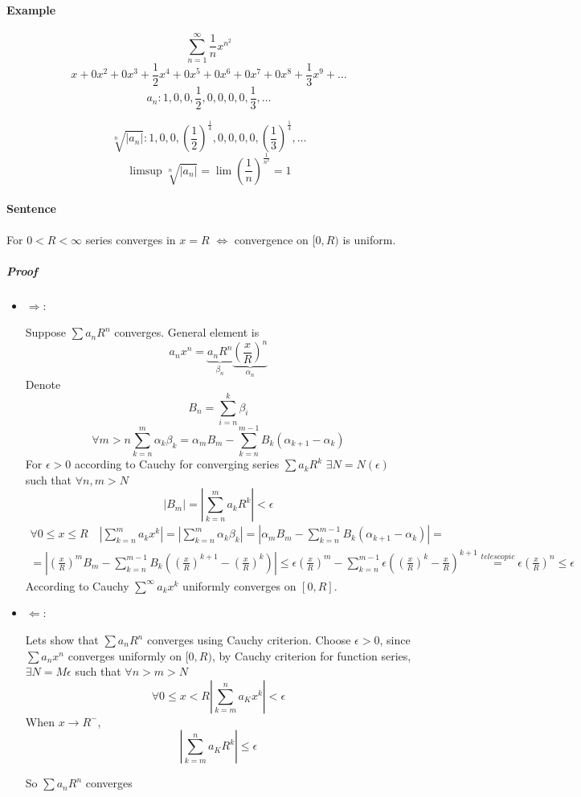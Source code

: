 \paragraph{Example}
$$\sum_{n=1}^{\infty} \frac{1}{n}x^{n^2}$$
$$x+0x^2+0x^3+\frac{1}{2}x^4+0x^5+0x^6+0x^7+0x^8+\frac{1}{3}x^9+\dots$$
$$a_n: 1,0,0,\frac{1}{2},0,0,0,0,\frac{1}{3},\dots$$

$$\sqrt[n]{|a_n|}: 1,0,0,\left(\frac{1}{2}\right)^{\frac{1}{4}},0,0,0,0,\left(\frac{1}{3}\right)^{\frac{1}{4}},\dots$$
$$\limsup \sqrt[n]{|a_n|} = \lim \left(\frac{1}{n}\right)^{\frac{1}{n^2}} =1 $$
\paragraph{Sentence}
For $0<R<\infty$ series converges in $x=R$ $\iff$ convergence on $[0, R)$ is uniform.
\subparagraph{Proof}
\begin{itemize}
	\item $\Rightarrow$:
	
	Suppose $\sum a_n R^n$ converges.  General element is
	$$a_n x^n = \underbrace{a_nR^n}_{\beta_n}\underbrace{ \left(\frac{x}{R}\right)^n}_{\alpha_n}$$
	Denote 
	$$B_n = \sum_{i=n}^k \beta_i$$
	$$\forall m>n \sum_{k=n}^{m} \alpha_k \beta_k = \alpha_m B_m - \sum_{k=n}^{m-1} B_k \left( \alpha_{k+1} - \alpha_k \right)$$
	For $\epsilon > 0$ according to Cauchy for converging series $\sum a_k R^k$ $\exists N = N(\epsilon)$ such that $\forall n,m > N$ 
	$$\left|B_m\right| = \left|\sum_{k=n}^m a_kR^k\right| < \epsilon$$
	\begin{align*}
	\forall 0 \leq x \leq R \quad  \left|\sum_{k=n}^m a_kx^k\right|  =  \left|\sum_{k=n}^m \alpha_k \beta_k \right| = \left|\alpha_m B_m - \sum_{k=n}^{m-1} B_k \left( \alpha_{k+1} - \alpha_k \right)\right| =\\= \left|\left(\frac{x}{R}\right)^mB_m - \sum_{k=n}^{m-1} B_k \left( \left(\frac{x}{R}\right)^{k+1} - \left(\frac{x}{R}\right)^k \right)\right| \leq \epsilon \left(\frac{x}{R}\right)^m- \sum_{k=n}^{m-1} \epsilon  \left(\left(\frac{x}{R}\right)^k - \frac{x}{R}\right)^{k+1}  \stackrel{telescopic}{=} \epsilon \left(\frac{x}{R}\right)^n \leq \epsilon
	\end{align*}
	According to Cauchy $\sum^\infty a_k x^k$ uniformly converges on $[0,R]$.
	\item $\Leftarrow$:
	
	Lets show that $\sum a_nR^n$ converges using Cauchy criterion.
	Choose $\epsilon > 0$, since $\sum a_nx^n$ converges uniformly on $[0,R)$, by Cauchy criterion for function series, $\exists N =M\epsilon$ such that $\forall n>m>N$ 
	$$\forall 0\leq x< R \left|\sum_{k=m}^n a_Kx^k\right| < \epsilon$$
	When $x \to R^-$,
	$$\left|\sum_{k=m}^n a_KR^k\right| \leq \epsilon$$
	
	So $\sum a_nR^n$ converges
\end{itemize} 